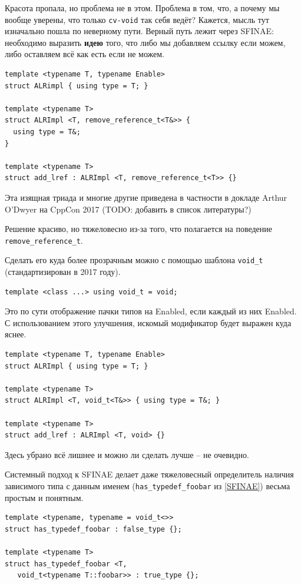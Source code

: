 \documentclass[a4paper,12pt,oneside]{book}
\begin{document}
Красота пропала, но проблема не в этом. Проблема в том, что, а почему мы вообще уверены, что только \lstinline!cv-void! так себя ведёт? Кажется, мысль тут изначально пошла по неверному пути. Верный путь лежит через SFINAE: необходимо выразить \textbf{идею} того, что либо мы добавляем ссылку если можем, либо оставляем всё как есть если не можем.

\begin{lstlisting}
template <typename T, typename Enable> 
struct ALRimpl { using type = T; }

template <typename T> 
struct ALRImpl <T, remove_reference_t<T&>> { 
  using type = T&; 
}

template <typename T> 
struct add_lref : ALRImpl <T, remove_reference_t<T>> {}
\end{lstlisting}

Эта изящная триада и многие другие приведена в частности в докладе Arthur O'Dwyer на CppCon 2017 (TODO: добавить в список литературы?)

Решение красиво, но тяжеловесно из-за того, что полагается на поведение \lstinline!remove_reference_t!.

Сделать его куда более прозрачным можно с помощью шаблона \lstinline!void_t! (стандартизирован в 2017 году).

\begin{lstlisting}
template <class ...> using void_t = void;
\end{lstlisting}

Это по сути отображение пачки типов на Enabled, если каждый из них Enabled. С использованием этого улучшения, искомый модификатор будет выражен куда яснее.

\begin{lstlisting}
template <typename T, typename Enable> 
struct ALRImpl { using type = T; }

template <typename T> 
struct ALRImpl <T, void_t<T&>> { using type = T&; }

template <typename T> 
struct add_lref : ALRImpl <T, void> {}
\end{lstlisting}
 
Здесь убрано всё лишнее и можно ли сделать лучше -- не очевидно.

Системный подход к SFINAE делает даже тяжеловесный определитель наличия зависимого типа с данным именем (\lstinline!has_typedef_foobar! из \ref{SFINAE}) весьма простым и понятным.

\begin{lstlisting}
template <typename, typename = void_t<>>
struct has_typedef_foobar : false_type {};

template <typename T> 
struct has_typedef_foobar <T, 
   void_t<typename T::foobar>> : true_type {};
\end{lstlisting}
\end{document}
